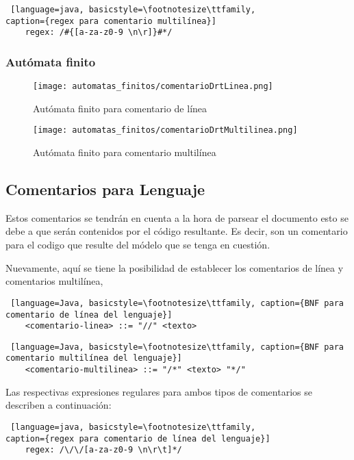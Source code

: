 \begin{lstlisting} [language=java, basicstyle=\footnotesize\ttfamily,
caption={regex para comentario multilínea}]
	regex: /#{[a-za-z0-9 \n\r]}#*/
\end{lstlisting}

\subsubsection{Autómata finito}

\begin{figure}[H]
	\centering
	\texttt{[image: automatas\_finitos/comentarioDrtLinea.png]}
	\caption{Autómata finito para comentario de línea}
	\label{fig:af_com_linea}
\end{figure}

\begin{figure}[H]
	\centering
	\texttt{[image: automatas\_finitos/comentarioDrtMultilinea.png]}
	\caption{Autómata finito para comentario multilínea}
	\label{fig:af_com_multi}
\end{figure}

\subsection{Comentarios para Lenguaje}
\label{sub:comentarioleng}
Estos comentarios se tendrán en cuenta a la hora de parsear el documento esto
se debe a que serán contenidos por el código resultante. Es decir, son un
comentario para el codigo que resulte del módelo que se tenga en cuestión.

Nuevamente, aquí se tiene la posibilidad de establecer los comentarios de línea
y comentarios multilínea,

\begin{lstlisting} [language=Java, basicstyle=\footnotesize\ttfamily, caption={BNF para
comentario de línea del lenguaje}]
	<comentario-linea> ::= "//" <texto>
\end{lstlisting}

\begin{lstlisting} [language=Java, basicstyle=\footnotesize\ttfamily, caption={BNF para
comentario multilínea del lenguaje}]
	<comentario-multilinea> ::= "/*" <texto> "*/"
\end{lstlisting}

Las respectivas expresiones regulares para ambos tipos de comentarios se
describen a continuación:

\begin{lstlisting} [language=java, basicstyle=\footnotesize\ttfamily,
caption={regex para comentario de línea del lenguaje}]
	regex: /\/\/[a-za-z0-9 \n\r\t]*/
\end{lstlisting}

